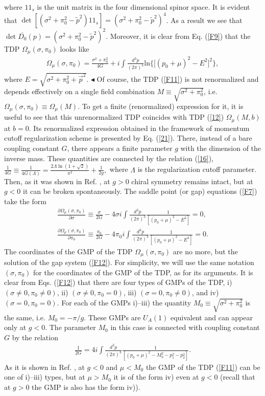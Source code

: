 \documentclass[12pt,a4paper]{article}
\begin{document}
where $1\!\!1_s$ is the unit matrix in the four dimensional spinor space. It is evident that $\det\left[(\sigma^2+\pi_0^2-\tilde p^2)1\!\!1_s\right]=(\sigma^2+\pi_0^2-\tilde p^2)^4$. As a result we see that $\det\overline{D_0}(p)=(\sigma^2+\pi_0^2-\tilde p^2)^2$. Moreover, it is clear from Eq. (\ref{F9}) that the TDP
$\Omega_\mu (\sigma,\pi_0)$ looks like
\begin{eqnarray}
\Omega_\mu (\sigma,\pi_0)=\frac{\sigma^2+\pi_0^2}{4G}+i\int\frac{d^3p}{(2\pi)^3}\mathrm{ln}\Big\{\big[(p_0+\mu)^2-E^2\big]^2\Big\},
\label{F11}
\end{eqnarray}
where $E=\sqrt{\sigma^2+\pi_0^2+\vec p^2}$. $\blacktriangleleft$ Of course, the TDP (\ref{F11})
is not renormalized and depends effectively on a single field combination $M\equiv
\sqrt{\sigma^2+\pi_0^2}$, i.e. $\Omega_\mu (\sigma,\pi_0)\equiv\Omega_\mu (M)$. To get a finite
(renormalized) expression for it, it is useful to see that this unrenormalized TDP coincides with TDP (\ref{12}) $\Omega_\mu (M,b)$ at $b=0$. Its renormalized expression obtained in the framework of momentum cutoff regularization scheme is presented by Eq. (\ref{21}). There, instead of a bare coupling constant $G$, there appears a finite parameter $g$ with the dimension of the inverse mass. These quantities are connected by the relation (\ref{16}), $\frac 1{4G}\equiv \frac
1{4G(\Lambda)}=\frac{2\Lambda\ln(1+\sqrt{2})}{\pi^2}+\frac{1}{2g},$ where $\Lambda$ is the regularization cutoff parameter. Then, as it was shown in Ref. \cite{klimenko}, at $g>0$ chiral symmetry remains intact, but at $g<0$ it can be broken spontaneously. The saddle point (or gap) equations (\ref{F7}) take the form
\begin{eqnarray}
\frac{\partial \Omega_\mu (\sigma,\pi_0)}{\partial\sigma}\equiv \frac{\sigma}{2G}-
4\sigma i\int\frac{d^3p}{(2\pi)^3}\frac{1}{[(p_0+\mu)^2-E^2]}=0,\nonumber\\
\frac{\partial \Omega_\mu (\sigma,\pi_0)}{\partial\pi_0}\equiv \frac{\pi_0}{2G}-
4\pi_0 i\int\frac{d^3p}{(2\pi)^3}\frac{1}{[(p_0+\mu)^2-E^2]}=0.
\label{F12}
\end{eqnarray}
The coordinates of the GMP of the TDP $\Omega_\mu(\sigma,\pi_0)$ are no more, but the solution of the gap system (\ref{F12}). For simplicity, we will use the same notation $(\sigma,\pi_0)$ for the coordinates of the GMP of the TDP, as for its arguments.
It is clear from Eqs. (\ref{F12}) that there are four types of GMPs of the TDP, i) $(\sigma\ne 0,\pi_0\ne 0)$,
ii) $(\sigma\ne 0,\pi_0=0)$, iii) $(\sigma=0,\pi_0\ne 0)$, and iv) $ (\sigma=0,\pi_0=0)$.
For each of the GMPs i)--iii) the quantity $M_0\equiv\sqrt{\sigma^2+\pi_0^2}$ is the same, i.e. $M_0=-\pi/g$. These GMPs are $U_A(1)$ equivalent and can appear only at $g<0$. The parameter $M_0$ in this case is connected with coupling constant $G$ by the relation
\begin{eqnarray}
\frac{1}{2G}=4 i\int\frac{d^3p}{(2\pi)^3}\frac{1}{[(p_0+\mu)^2-M_0^2-p_1^2-p_2^2]}.
\label{F13}
\end{eqnarray}
As it is shown in Ref. \cite{klimenko}, at $g<0$ and $\mu<M_0$ the GMP of the TDP (\ref{F11}) can be one of i)--iii) types, but at $\mu>M_0$ it is of the form iv) even at $g<0$ (recall that at $g>0$ the GMP is also has the form iv)).
\end{document}
